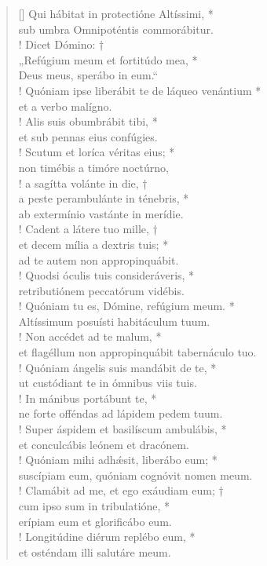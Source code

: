 \begin{verse}[\versewidth]
Qui hábitat in protectióne Altíssimi, *\\
sub umbra Omnipoténtis commorábitur.\\!
\vin Dicet Dómino: †\\
\vin „Refúgium meum et fortitúdo mea, *\\
\vin Deus meus, sperábo in eum.“\\!
Quóniam ipse liberábit te de láqueo venántium *\\
et a verbo malígno.\\!
\vin Alis suis obumbrábit tibi, *\\
\vin et sub pennas eius confúgies.\\!
Scutum et loríca véritas eius; *\\
non timébis a timóre noctúrno,\\!
\vin a sagítta volánte in die, †\\
\vin a peste perambulánte in ténebris, *\\
\vin ab extermínio vastánte in merídie.\\!
Cadent a látere tuo mille, †\\
et decem mília a dextris tuis; *\\
ad te autem non appropinquábit.\\!
\vin Quodsi óculis tuis consideráveris, *\\
\vin retributiónem peccatórum vidébis.\\!
Quóniam tu es, Dómine, refúgium meum. *\\
Altíssimum posuísti habitáculum tuum.\\!
\vin Non accédet ad te malum, *\\
\vin et flagéllum non appropinquábit tabernáculo tuo.\\!
Quóniam ángelis suis mandábit de te, *\\
ut custódiant te in ómnibus viis tuis.\\!
\vin In mánibus portábunt te, *\\
\vin ne forte offéndas ad lápidem pedem tuum.\\!
Super áspidem et basilíscum ambulábis, *\\
et conculcábis leónem et dracónem.\\!
\vin Quóniam mihi adh\'{æ}sit, liberábo eum; *\\
\vin suscípiam eum, quóniam cognóvit nomen meum.\\!
Clamábit ad me, et ego exáudiam eum; †\\
cum ipso sum in tribulatióne, *\\
erípiam eum et glorificábo eum.\\!
\vin Longitúdine diérum replébo eum, *\\
\vin et osténdam illi salutáre meum.\\
\end{verse}
\vspace{1cm}


